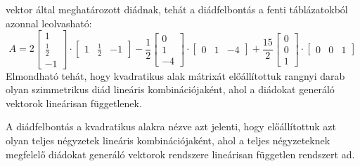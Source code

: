 \documentclass[a4paper, showtrims]{memoir}
\theoremstyle{plain}
\theoremstyle{remark}
\theoremstyle{definition}
\begin{document}
\)
vektor által meghatározott diádnak, tehát a diádfelbontás a fenti táblázatokból azonnal leolvasható:
\[
    A
    =
    2
    \begin{bmatrix}
    1\\ \frac{1}{2}\\ -1
    \end{bmatrix}
    \cdot
    \begin{bmatrix}
    1& \frac{1}{2}& -1
    \end{bmatrix}
    -\frac{1}{2}
    \begin{bmatrix}
        0\\1\\-4
    \end{bmatrix}
    \cdot
    \begin{bmatrix}
        0&1&-4
    \end{bmatrix}
    +
    \frac{15}{2}
    \begin{bmatrix}
        0\\0\\1
    \end{bmatrix}
    \cdot
    \begin{bmatrix}
        0&0&1
    \end{bmatrix}
\]
Elmondható tehát, hogy kvadratikus alak mátrixát előállítottuk rangnyi darab 
olyan szimmetrikus diád lineáris kombinációjaként, ahol a diádokat generáló
vektorok lineárisan függetlenek.%

A diádfelbontás a kvadratikus alakra nézve azt jelenti, 
hogy előállítottuk azt olyan teljes négyzetek lineáris kombinációjaként,
ahol a teljes négyzeteknek megfelelő diádokat generáló vektorok rendszere lineárisan független rendszert ad.
\end{document}
